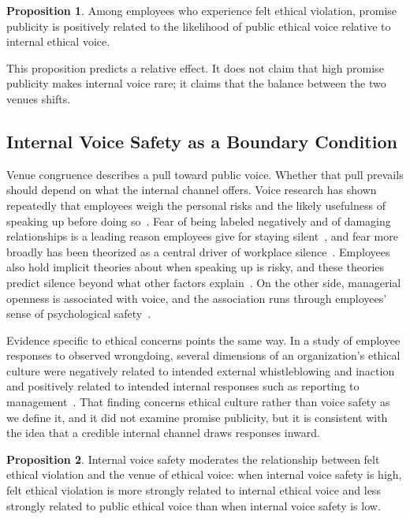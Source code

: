 \documentclass[12pt,a4paper]{article}
\theoremstyle{definition}
\newtheorem{proposition}{Proposition}
\begin{document}
\begin{proposition}
Among employees who experience felt ethical violation, promise publicity is positively related to the likelihood of public ethical voice relative to internal ethical voice.
\end{proposition}

This proposition predicts a relative effect. It does not claim that high promise publicity makes internal voice rare; it claims that the balance between the two venues shifts.

\subsection{Internal Voice Safety as a Boundary Condition}

Venue congruence describes a pull toward public voice. Whether that pull prevails should depend on what the internal channel offers. Voice research has shown repeatedly that employees weigh the personal risks and the likely usefulness of speaking up before doing so~\citep{morrison2014employee,morrison2023employee}. Fear of being labeled negatively and of damaging relationships is a leading reason employees give for staying silent~\citep{milliken2003exploratory}, and fear more broadly has been theorized as a central driver of workplace silence~\citep{kishgephart2009silenced}. Employees also hold implicit theories about when speaking up is risky, and these theories predict silence beyond what other factors explain~\citep{detert2011implicit}. On the other side, managerial openness is associated with voice, and the association runs through employees' sense of psychological safety~\citep{detert2007leadership}.

Evidence specific to ethical concerns points the same way. In a study of employee responses to observed wrongdoing, several dimensions of an organization's ethical culture were negatively related to intended external whistleblowing and inaction and positively related to intended internal responses such as reporting to management~\citep{kaptein2011inaction}. That finding concerns ethical culture rather than voice safety as we define it, and it did not examine promise publicity, but it is consistent with the idea that a credible internal channel draws responses inward.

\begin{proposition}
Internal voice safety moderates the relationship between felt ethical violation and the venue of ethical voice: when internal voice safety is high, felt ethical violation is more strongly related to internal ethical voice and less strongly related to public ethical voice than when internal voice safety is low.
\end{proposition}
\end{document}
